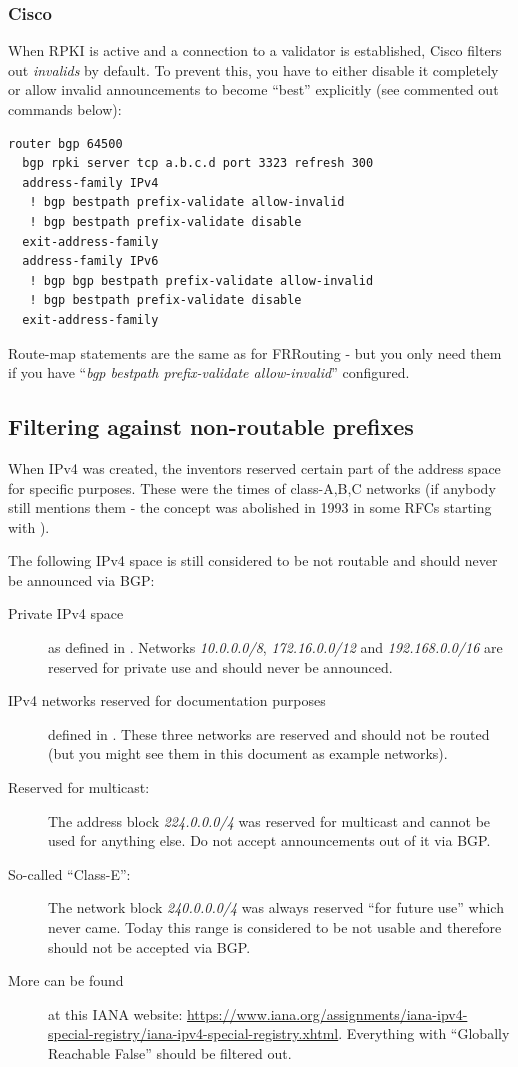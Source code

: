 \subsubsection{Cisco}
When RPKI is active and a connection to a validator is established, Cisco filters out \emph{invalids} by default. To prevent this, you have to either disable it completely or allow invalid announcements to become ``best'' explicitly (see commented out commands below):

\begin{verbatim}
router bgp 64500
  bgp rpki server tcp a.b.c.d port 3323 refresh 300
  address-family IPv4
   ! bgp bestpath prefix-validate allow-invalid
   ! bgp bestpath prefix-validate disable
  exit-address-family
  address-family IPv6
   ! bgp bgp bestpath prefix-validate allow-invalid
   ! bgp bestpath prefix-validate disable
  exit-address-family
\end{verbatim}

Route-map statements are the same as for FRRouting - but you only need them if you have ``\emph{bgp bestpath prefix-validate allow-invalid}'' configured.


\subsection{Filtering against non-routable prefixes}
When IPv4 was created, the inventors reserved certain part of the address space for specific purposes. These were the times of class-A,B,C networks (if anybody still mentions them - the concept was abolished in 1993 in some RFCs starting with ).

The following IPv4 space is still considered to be not routable and should never be announced via BGP:
\begin{description}
  \item[Private IPv4 space] as defined in . Networks \emph{10.0.0.0/8}, \emph{172.16.0.0/12} and \emph{192.168.0.0/16} are reserved for private use and should never be announced.
  \item[IPv4 networks reserved for documentation purposes] defined in . These three networks are reserved and should not be routed (but you might see them in this document as example networks).
  \item[Reserved for multicast:] The address block \emph{224.0.0.0/4} was reserved for multicast and cannot be used for anything else. Do not accept announcements out of it via BGP.
  \item[So-called ``Class-E'':] The network block \emph{240.0.0.0/4} was always reserved ``for future use'' which never came. Today this range is considered to be not usable and therefore should not be accepted via BGP.
  \item[More can be found] at this IANA website: \url{https://www.iana.org/assignments/iana-ipv4-special-registry/iana-ipv4-special-registry.xhtml}. Everything with ``Globally Reachable False'' should be filtered out.
\end{description}


